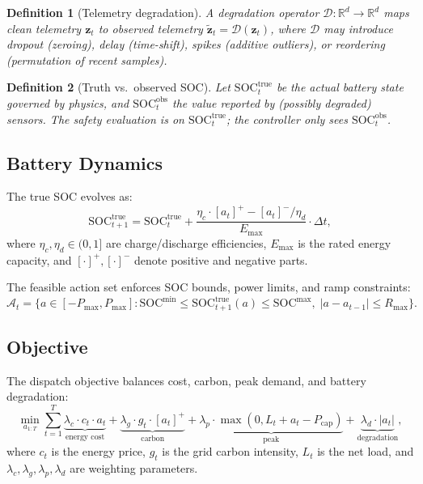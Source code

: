 \documentclass[11pt,a4paper,twocolumn]{article}
\newtheorem{definition}{Definition}
\begin{document}
\begin{definition}[Telemetry degradation]
A degradation operator $\mathcal{D}: \mathbb{R}^d \to \mathbb{R}^d$ maps clean telemetry $\mathbf{z}_t$ to observed telemetry $\tilde{\mathbf{z}}_t = \mathcal{D}(\mathbf{z}_t)$, where $\mathcal{D}$ may introduce dropout (zeroing), delay (time-shift), spikes (additive outliers), or reordering (permutation of recent samples).
\end{definition}

\begin{definition}[Truth vs.\ observed SOC]
Let $\text{SOC}_t^{\mathrm{true}}$ be the actual battery state governed by physics, and $\text{SOC}_t^{\mathrm{obs}}$ the value reported by (possibly degraded) sensors.  The safety evaluation is on $\text{SOC}_t^{\mathrm{true}}$; the controller only sees $\text{SOC}_t^{\mathrm{obs}}$.
\end{definition}

\subsection{Battery Dynamics}

The true SOC evolves as:
\begin{equation}\label{eq:soc_dynamics}
  \text{SOC}_{t+1}^{\mathrm{true}} = \text{SOC}_t^{\mathrm{true}}
    + \frac{\eta_c \cdot [a_t]^+ - [a_t]^- / \eta_d}{E_{\max}} \cdot \Delta t,
\end{equation}
where $\eta_c, \eta_d \in (0,1]$ are charge/discharge efficiencies, $E_{\max}$ is the rated energy capacity, and $[\cdot]^+, [\cdot]^-$ denote positive and negative parts.

The feasible action set enforces SOC bounds, power limits, and ramp constraints:
\begin{equation}\label{eq:constraints}
  \mathcal{A}_t = \bigl\{ a \in [-P_{\max}, P_{\max}] :
    \text{SOC}^{\min} \le \text{SOC}_{t+1}^{\mathrm{true}}(a) \le \text{SOC}^{\max},\;
    |a - a_{t-1}| \le R_{\max} \bigr\}.
\end{equation}

\subsection{Objective}

The dispatch objective balances cost, carbon, peak demand, and battery degradation:
\begin{equation}\label{eq:objective}
  \min_{a_{1:T}} \sum_{t=1}^{T}
    \underbrace{\lambda_c \cdot c_t \cdot a_t}_{\text{energy cost}}
    + \underbrace{\lambda_g \cdot g_t \cdot [a_t]^+}_{\text{carbon}}
    + \underbrace{\lambda_p \cdot \max(0, L_t + a_t - P_{\text{cap}})}_{\text{peak}}
    + \underbrace{\lambda_d \cdot |a_t|}_{\text{degradation}},
\end{equation}
where $c_t$ is the energy price, $g_t$ is the grid carbon intensity, $L_t$ is the net load, and $\lambda_c, \lambda_g, \lambda_p, \lambda_d$ are weighting parameters.
\end{document}
